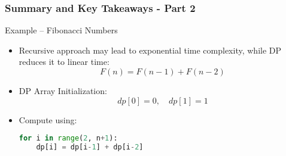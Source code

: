 \documentclass[aspectratio=169]{beamer}
\begin{document}
\begin{frame}[fragile]
    \frametitle{Summary and Key Takeaways - Part 2}
    
    \begin{block}{Example – Fibonacci Numbers}
        \begin{itemize}
            \item Recursive approach may lead to exponential time complexity, while DP reduces it to linear time:
            \begin{equation}
                F(n) = F(n-1) + F(n-2) 
            \end{equation}
            \item DP Array Initialization: 
            \begin{equation}
                dp[0] = 0, \quad dp[1] = 1 
            \end{equation}
            \item Compute using:
            \begin{lstlisting}[language=Python]
for i in range(2, n+1):
    dp[i] = dp[i-1] + dp[i-2]
            \end{lstlisting}
        \end{itemize}
    \end{block}
\end{frame}
\end{document}
